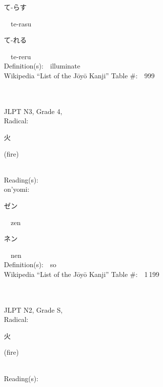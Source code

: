 \begin{multicols}{2}
{\hspace*{2em}}{\begin{CJK}{UTF8}{min} て-らす \end{CJK}}\ \ te-rasu\ \ \\
{\hspace*{2em}}{\begin{CJK}{UTF8}{min} て-れる \end{CJK}}\ \ te-reru\ \ \\
Definition(s):\ \ illuminate \\
Wikipedia ``List of the J\=oy\=o Kanji'' Table \#:\ \ 999 \\
\ \ \\
{\fontsize{34pt}{40pt}  }\ \ \\  %
{JLPT N3, Grade 4, \\Radical:\ \ {\begin{CJK}{UTF8}{min} 火 \end{CJK}} (fire) } \\
Reading(s):\ \ \\
{\hspace*{1em}}on'yomi:\ \ \\
{\hspace*{2em}}{\begin{CJK}{UTF8}{min} ゼン \end{CJK}}\ \ zen\ \ \\
{\hspace*{2em}}{\begin{CJK}{UTF8}{min} ネン \end{CJK}}\ \ nen\ \ \\
Definition(s):\ \ so \\
Wikipedia ``List of the J\=oy\=o Kanji'' Table \#:\ \ 1\,199 \\
\ \ \\
{\fontsize{34pt}{40pt}  }\ \ \\  %
{JLPT N2, Grade S, \\Radical:\ \ {\begin{CJK}{UTF8}{min} 火 \end{CJK}} (fire) } \\
Reading(s):\ \ \\

\end{multicols}
